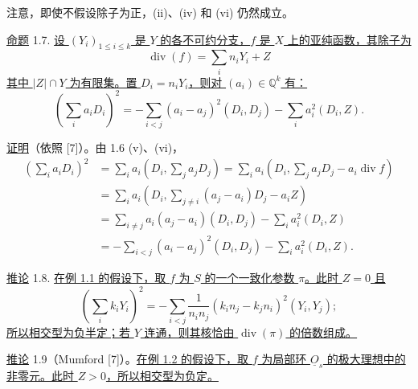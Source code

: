 注意，即使不假设除子为正，(ii)、(iv) 和 (vi) 仍然成立。


\underline{命题} 1.7. \underline{设 $(Y_i)_{1\leq i\leq k}$ 是 $Y$ 的各不可约分支，$f$ 是 $X$ 上的亚纯函数，其除子为}
\begin{equation*}
\operatorname{div}(f)=\sum_i n_iY_i+Z
\end{equation*}
\underline{其中 $|Z|\cap Y$ 为有限集。置 $D_i=n_iY_i$，则对 $(a_i)\in\mathbb Q^k$ 有：}
\begin{equation*}
\left(\sum_i a_iD_i\right)^2
=-\sum_{i<j}(a_i-a_j)^2(D_i,D_j)-\sum_i a_i^2(D_i,Z).
\end{equation*}

\underline{证明}（依照 [7]）。由 1.6 (v)、(vi)，
\begin{equation*}
\begin{aligned}
\left(\sum_i a_iD_i\right)^2
&=\sum_i a_i\left(D_i,\sum_j a_jD_j\right)
=\sum_i a_i\left(D_i,\sum_j a_jD_j-a_i\operatorname{div}f\right)\\
&=\sum_i a_i\left(D_i,\sum_{j\ne i}(a_j-a_i)D_j-a_iZ\right)\\
&=\sum_{i\ne j}a_i(a_j-a_i)(D_i,D_j)-\sum_i a_i^2(D_i,Z)\\
&=-\sum_{i<j}(a_i-a_j)^2(D_i,D_j)-\sum_i a_i^2(D_i,Z).
\end{aligned}
\end{equation*}

\underline{推论} 1.8. \underline{在例 1.1 的假设下，取 $f$ 为 $S$ 的一个一致化参数 $\pi$。此时 $Z=0$ 且}
\begin{equation*}
\left(\sum_i k_iY_i\right)^2
=-\sum_{i<j}\frac{1}{n_in_j}(k_in_j-k_jn_i)^2(Y_i,Y_j);
\end{equation*}
\underline{所以相交型为负半定；若 $Y$ 连通，则其核恰由 $\operatorname{div}(\pi)$ 的倍数组成。}

\underline{推论} 1.9（Mumford [7]）。\underline{在例 1.2 的假设下，取 $f$ 为局部环 $\underline O_s$ 的极大理想中的非零元。此时 $Z>0$，所以相交型为负定。}